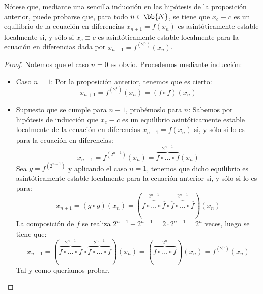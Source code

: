 \begin{observacion}
    Nótese que, mediante una sencilla inducción en las hipótesis de la proposición anterior, puede probarse que, para todo $n\in \bb{N}$, se tiene que $x_c \equiv c$ es un equilibrio de la ecuación en diferencias $x_{n+1} = f(x_n)$ es asintóticamente estable localmente si, y sólo si $x_c \equiv c$ es asintóticamente estable localmente para la ecuación en diferencias dada por $x_{n+1} = f^{(2^n)}(x_n)$.
\end{observacion}
\begin{proof}
    Notemos que el caso $n = 0$ es obvio. Procedemos mediante inducción:
    \begin{itemize}
        \item \ul{Caso $n = 1$:}
        Por la proposición anterior, tenemos que es cierto:
        \begin{equation*}
            x_{n+1} = f^{(2^1)}(x_n) = (f \circ f)(x_n) 
        \end{equation*}

        \item \ul{Supuesto que se cumple para $n-1$, probémoslo para $n$:}
        Sabemos por hipótesis de inducción que $x_c \equiv c$ es un equilibrio asintóticamente estable localmente de la ecuación en diferencias $x_{n+1} = f(x_n)$ si, y sólo si lo es para la ecuación en diferencias:
        \begin{equation*}
            x_{n+1} = f^{(2^{n-1})}(x_n) = \overbrace{f \circ \ldots \circ f}^{2^{n-1}}(x_n)
        \end{equation*}
        Sea $g = f^{(2^{n-1})}$ y aplicando el caso $n = 1$, tenemos que dicho equilibrio es asintóticamente estable localmente para la ecuación anterior si, y sólo si lo es para:
        \begin{equation*}
            x_{n+1} = (g \circ g)(x_n) = (\overbrace{f \circ \ldots \circ f}^{2^{n-1}} \circ \overbrace{f \circ \ldots \circ f}^{2^{n-1}})(x_n)
        \end{equation*}
        La composición de $f$ se realiza $2^{n-1} + 2^{n-1} = 2\cdot 2^{n-1} = 2^n$ veces, luego se tiene que:
        \begin{equation*}
            x_{n+1} = (\overbrace{f \circ \ldots \circ f}^{2^{n-1}} \circ \overbrace{f \circ \ldots \circ f}^{2^{n-1}})(x_n) = (\overbrace{f \circ \ldots \circ f}^{2^n})(x_n) = f^{(2^n)}(x_n)
        \end{equation*}
        Tal y como queríamos probar.
    \end{itemize}
\end{proof}

